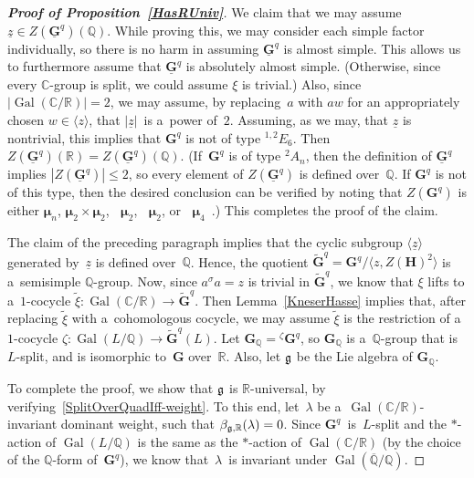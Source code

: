 \documentclass[11pt]{article}
\DeclareMathOperator{\Gal}{Gal}
\numberwithin{equation}{section}
\newcommand{\Res}[1]{\mathop{\mathbf{R}_{#1}}}
\newcommand{\ResOne}[1]{\mathop{\mathbf{R}^{(1)}_{#1}}}
\newcommand{\Lie}[1]{\mathfrak{\lowercase{#1}}}
\begin{document}
\begin{proof}[\bf Proof of Proposition~\ref{HasRUniv}]
We claim that we may assume $\underline z \in Z(\underline{\mathbf{G}}^q)(\mathbb{Q})$.
While proving this, we may consider each simple factor individually, so there is no harm in assuming
$\underline{\mathbf{G}}^q$ is almost simple.
This allows us to furthermore assume that $\underline{\mathbf{G}}^q$ is absolutely almost simple.
(Otherwise, since every $\mathbb{C}$-group is split, we could assume $\xi$ is trivial.) Also, since
$|{\Gal(\mathbb{C}/\mathbb{R})}| = 2$, we may assume, by replacing~$a$ with $aw$ for an appropriately chosen $w \in
\langle z \rangle$, that $|\underline z|$~is a~power of~$2$.
Assuming, as we may, that $\underline z$ is nontrivial, this implies that $\mathbf{G}^q$ is not of type ${}^{1,2} E_6$.
Then $Z(\underline{\mathbf{G}}^q)(\mathbb{R}) = Z(\underline{\mathbf{G}}^q)(\mathbb{Q})$.
(If~$\mathbf{G}^q$ is of type ${}^2 A_n$, then the def\/inition of $\underline{\mathbf{G}}^q$ implies
$|Z(\underline{\mathbf{G}}^q)| \le 2$, so every element of $Z(\underline{\mathbf{G}}^q)$ is def\/ined over~$\mathbb{Q}$.
If $\mathbf{G}^q$ is not of this type, then the desired conclusion can be verif\/ied by noting that $Z(\mathbf{G}^q)$ is
either $\boldsymbol\mu_n$, $\boldsymbol\mu_2 \times \boldsymbol\mu_2$, $\Res{L/\mathbb{Q}} \boldsymbol\mu_2$,
$\ResOne{L/\mathbb{Q}} \boldsymbol\mu_2$, or $\ResOne{L/\mathbb{Q}}
\boldsymbol\mu_4$~\cite[p.~332]{PlatonovRapinchukBook}.) This completes the proof of the claim.

The claim of the preceding paragraph implies that the cyclic subgroup $\langle \underline z \rangle$ generated
by~$\underline z$ is def\/ined over~$\mathbb{Q}$.
Hence, the quotient $\widetilde{\mathbf{G}}^q = \mathbf{G}^q/\langle z, Z(\mathbf{H})^2 \rangle$ is a~semisimple
$\mathbb{Q}$-group.
Now, since $a {}^\sigma a = z$ is trivial in $\widetilde{\mathbf{G}}^q$, we know that $\xi$ lifts to a~$1$-cocycle
$\widetilde\xi \colon \Gal(\mathbb{C}/\mathbb{R}) \to \widetilde{\mathbf{G}}^q$.
Then Lemma~\ref{KneserHasse} implies that, after replacing $\widetilde\xi$ with a~cohomologous cocycle, we may assume
$\widetilde\xi$ is the restriction of a~$1$-cocycle $\zeta \colon \Gal(L/\mathbb{Q}) \to \widetilde{\mathbf{G}}^q(L)$.
Let $\mathbf{G}_\mathbb{Q} = {}^\zeta \mathbf{G}^q$, so $\mathbf{G}_\mathbb{Q}$ is a~$\mathbb{Q}$-group that
is~$L$-split, and is isomorphic to~$\mathbf{G}$ over~$\mathbb{R}$.
Also, let $\Lie G$ be the Lie algebra of $\mathbf{G}_\mathbb{Q}$.

To complete the proof, we show that $\Lie G$ is $\mathbb{R}$-universal, by verifying~\eqref{SplitOverQuadIff-weight}.
To this end, let~$\lambda$ be a~$\Gal(\mathbb{C}/\mathbb{R})$-invariant dominant weight, such that $\beta_{\Lie
G,\mathbb{R}}(\lambda) = 0$.
Since $\mathbf{G}^q$~is~$L$-split and the $*$-action of $\Gal(L/\mathbb{Q})$ is the same as the $*$-action of
$\Gal(\mathbb{C}/\mathbb{R})$ (by the choice of the $\mathbb{Q}$-form of~$\mathbf{G}^q$), we know that~$\lambda$~is
invariant under $\Gal(\overline{\mathbb{Q}}/\mathbb{Q})$.


\end{proof}
\end{document}
